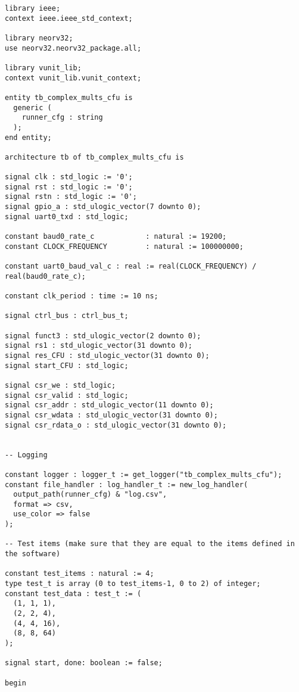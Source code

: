 \begin{code}
\begin{verbatim}
library ieee;
context ieee.ieee_std_context;

library neorv32;
use neorv32.neorv32_package.all;

library vunit_lib;
context vunit_lib.vunit_context;

entity tb_complex_mults_cfu is
  generic (
    runner_cfg : string
  );
end entity;

architecture tb of tb_complex_mults_cfu is

signal clk : std_logic := '0';
signal rst : std_logic := '0';
signal rstn : std_logic := '0';
signal gpio_a : std_ulogic_vector(7 downto 0);
signal uart0_txd : std_logic;

constant baud0_rate_c            : natural := 19200;
constant CLOCK_FREQUENCY         : natural := 100000000;

constant uart0_baud_val_c : real := real(CLOCK_FREQUENCY) / real(baud0_rate_c);

constant clk_period : time := 10 ns;

signal ctrl_bus : ctrl_bus_t;

signal funct3 : std_ulogic_vector(2 downto 0);
signal rs1 : std_ulogic_vector(31 downto 0);
signal res_CFU : std_ulogic_vector(31 downto 0);
signal start_CFU : std_logic;

signal csr_we : std_logic;
signal csr_valid : std_logic;
signal csr_addr : std_ulogic_vector(11 downto 0);
signal csr_wdata : std_ulogic_vector(31 downto 0);
signal csr_rdata_o : std_ulogic_vector(31 downto 0);


-- Logging

constant logger : logger_t := get_logger("tb_complex_mults_cfu");
constant file_handler : log_handler_t := new_log_handler(
  output_path(runner_cfg) & "log.csv",
  format => csv,
  use_color => false
);

-- Test items (make sure that they are equal to the items defined in the software)

constant test_items : natural := 4;
type test_t is array (0 to test_items-1, 0 to 2) of integer;
constant test_data : test_t := (
  (1, 1, 1),
  (2, 2, 4),
  (4, 4, 16),
  (8, 8, 64)
);

signal start, done: boolean := false;

begin


\end{verbatim}
\end{code}
